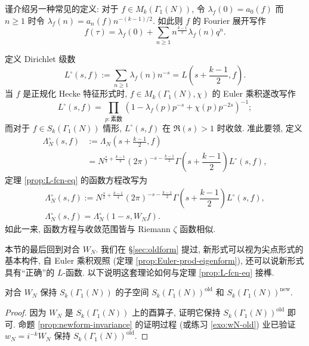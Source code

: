 \begin{remark}\label{rem:L-circ}
	谨介绍另一种常见的定义: 对于 $f \in M_k(\Gamma_1(N))$, 令 $\lambda_f(0) = a_0(f)$ 而 $n \geq 1$ 时令 $\lambda_f(n) = a_n(f)n^{-(k-1)/2}$. 如此则 $f$ 的 Fourier 展开写作
	\[ f(\tau) = \lambda_f(0) + \sum_{n \geq 1} n^{\frac{k-1}{2}} \lambda_f(n) q^n. \]

	定义 Dirichlet 级数
	\[ L^\circ(s, f) := \sum_{n \geq 1} \lambda_f(n) n^{-s} = L\left(s + \dfrac{k-1}{2}, f\right). \]
	当 $f$ 是正规化 Hecke 特征形式时, $f \in M_k(\Gamma_1(N), \chi)$ 的 Euler 乘积遂改写作
	\[ L^\circ(s, f) = \prod_{p: \text{素数}} \left( 1 - \lambda_f(p) p^{-s} + \chi(p) p^{-2s} \right)^{-1}; \]
	而对于 $f \in S_k(\Gamma_1(N))$ 情形, $L^\circ(s,f)$ 在 $\Re(s) > 1$ 时收敛. 准此要领, 定义
	\begin{align*}
		\Lambda_N^\circ(s, f) & := \Lambda_N\left( s + \frac{k-1}{2}, f\right) \\
		& = N^{\frac{s}{2} + \frac{k-1}{4}} (2\pi)^{-s - \frac{k-1}{2}} \Gamma\left( s + \dfrac{k-1}{2} \right) L^\circ(s, f),
	\end{align*}
	定理 \ref{prop:L-fcn-eq} 的函数方程改写为
	\begin{gather*}
		\Lambda_N^\circ(s, f) := N^{\frac{s}{2} + \frac{k-1}{4}} (2\pi)^{-s - \frac{k-1}{2}} \Gamma\left( s + \dfrac{k-1}{2} \right) L^\circ(s, f), \\
		\Lambda_N^\circ(s, f) = \Lambda_N^\circ(1-s, W_N f).
	\end{gather*}
	如此一来, 函数方程与收敛范围皆与 Riemann $\zeta$ 函数相似.
\end{remark}

本节的最后回到对合 $W_N$. 我们在 \S\ref{sec:oldform} 提过, 新形式可以视为尖点形式的基本构件, 自 Euler 乘积观照 (定理 \ref{prop:Euler-prod-eigenform}), 还可以说新形式具有``正确''的 $L$-函数. 以下说明这套理论如何与定理 \ref{prop:L-fcn-eq} 接榫.

\begin{lemma}
	对合 $W_N$ 保持 $S_k(\Gamma_1(N))$ 的子空间 $S_k(\Gamma_1(N))^{\mathrm{old}}$ 和 $S_k(\Gamma_1(N))^{\mathrm{new}}$.
\end{lemma}
\begin{proof}
	因为 $W_N$ 是 $S_k(\Gamma_1(N))$ 上的酉算子, 证明它保持 $S_k(\Gamma_1(N))^{\mathrm{old}}$ 即可. 命题 \ref{prop:newform-invariance} 的证明过程 (或练习 \ref{exo:wN-old}) 业已验证 $w_N = i^{-k} W_N$ 保持 $S_k(\Gamma_1(N))^{\mathrm{old}}$.
\end{proof}

